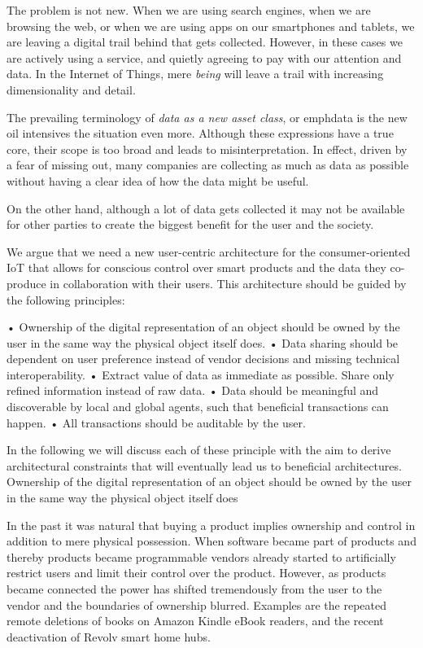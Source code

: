 The problem is not new.  When we are using search engines, when we are browsing the web, or when we are using apps on our smartphones and tablets, we are leaving a digital trail behind that gets collected. However, in these cases we are actively using a service, and quietly agreeing to pay with our attention and data. In the Internet of Things, mere \emph{being} will leave a trail with increasing dimensionality and detail.  

The prevailing terminology of \emph{data as a new asset class}, or emph{data is the new oil} intensives the situation even more. Although these expressions have a true core, their scope is too broad and leads to misinterpretation. In effect, driven by a fear of missing out, many companies are collecting as much as data as possible without having a clear idea of how the data might be useful. 

On the other hand, although a lot of data gets collected it may not be available for other parties to create the biggest benefit for the user and the society. 

We argue that we need a new user-centric architecture for the consumer-oriented IoT that allows for conscious control over smart products and the data they co-produce in collaboration with their users. This architecture should be guided by the following principles:

\begin{itemize}

•	Ownership of the digital representation of an object should be owned by the user in the same way the physical object itself does.
•	Data sharing should be dependent on user preference instead of vendor decisions and missing technical interoperability.
•	Extract value of data as immediate as possible. Share only refined information instead of raw data.
•	Data should be meaningful and discoverable by local and global agents, such that beneficial transactions can happen.
•	All transactions should be auditable by the user.

\end{itemize}

In the following we will discuss each of these principle with the aim to derive architectural constraints that will eventually lead us to beneficial architectures.
Ownership of the digital representation of an object should be owned by the user in the same way the physical object itself does

In the past it was natural that buying a product implies ownership and control in addition to mere physical possession. When software became part of products and thereby products became programmable vendors already started to artificially restrict users and limit their control over the product. However, as products became connected the power has shifted tremendously from the user to the vendor and the boundaries of ownership blurred. Examples are the repeated remote deletions of books on Amazon Kindle eBook readers, and the recent deactivation of Revolv smart home hubs. 

